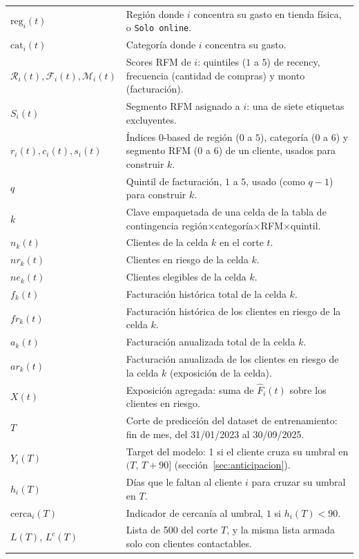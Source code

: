 \documentclass[11pt,a4paper]{article}
\begin{document}
\begin{longtable}{@{}l p{10.7cm}@{}}
$\mathrm{reg}_i(t)$ & Región donde $i$ concentra su gasto en tienda física, o \texttt{Solo online}. \\
$\mathrm{cat}_i(t)$ & Categoría donde $i$ concentra su gasto. \\
$\mathcal R_i(t), \mathcal F_i(t), \mathcal M_i(t)$ & Scores RFM de $i$: quintiles ($1$ a $5$) de recency, frecuencia (cantidad de compras) y monto (facturación). \\
$S_i(t)$ & Segmento RFM asignado a $i$: una de siete etiquetas excluyentes. \\
$r_i(t),c_i(t),s_i(t)$ & Índices 0-based de región ($0$ a $5$), categoría ($0$ a $6$) y segmento RFM ($0$ a $6$) de un cliente, usados para construir $k$. \\
$q$ & Quintil de facturación, $1$ a $5$, usado (como $q-1$) para construir $k$. \\
$k$ & Clave empaquetada de una celda de la tabla de contingencia región$\times$categoría$\times$RFM$\times$quintil. \\
$n_k(t)$ & Clientes de la celda $k$ en el corte $t$. \\
$nr_k(t)$ & Clientes en riesgo de la celda $k$. \\
$ne_k(t)$ & Clientes elegibles de la celda $k$. \\
$f_k(t)$ & Facturación histórica total de la celda $k$. \\
$fr_k(t)$ & Facturación histórica de los clientes en riesgo de la celda $k$. \\
$a_k(t)$ & Facturación anualizada total de la celda $k$. \\
$ar_k(t)$ & Facturación anualizada de los clientes en riesgo de la celda $k$ (exposición de la celda). \\
$X(t)$ & Exposición agregada: suma de $\hat F_i(t)$ sobre los clientes en riesgo. \\
\midrule
$T$ & Corte de predicción del dataset de entrenamiento: fin de mes, del 31/01/2023 al 30/09/2025. \\
$Y_i(T)$ & Target del modelo: 1 si el cliente cruza su umbral en $(T,\,T+90]$ (sección~\ref{sec:anticipacion}). \\
$h_i(T)$ & Días que le faltan al cliente $i$ para cruzar su umbral en $T$. \\
$\mathrm{cerca}_i(T)$ & Indicador de cercanía al umbral, $1$ si $h_i(T) < 90$. \\
$L(T)$, $L^{c}(T)$ & Lista de 500 del corte $T$, y la misma lista armada solo con clientes contactables. \\

\end{longtable}
\end{document}
